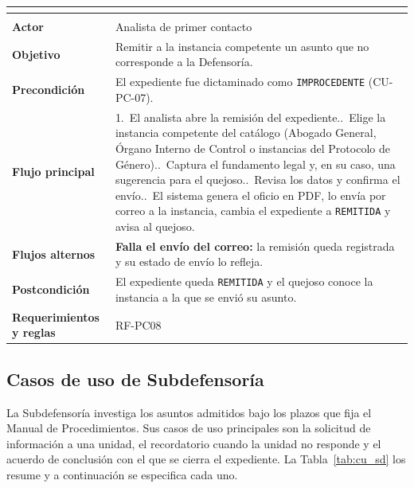 \begingroup
{}
\small
\renewcommand{\arraystretch}{1.25}
\setlength{\tabcolsep}{4pt}
\begin{longtable}{|L{3.2cm}|L{12.4cm}|}
	\hline
	 \\
	\hline
	\endfirsthead
	\hline
	 \\
	\hline
	\endhead
	\textbf{Actor} & Analista de primer contacto \\ \hline
	\textbf{Objetivo} & Remitir a la instancia competente un asunto que no corresponde a la Defensoría. \\ \hline
	\textbf{Precondición} & El expediente fue dictaminado como \texttt{IMPROCEDENTE} (CU-PC-07). \\ \hline
	\textbf{Flujo principal} & 1.~El analista abre la remisión del expediente..~Elige la instancia competente del catálogo (Abogado General, Órgano Interno de Control o instancias del Protocolo de Género)..~Captura el fundamento legal y, en su caso, una sugerencia para el quejoso..~Revisa los datos y confirma el envío..~El sistema genera el oficio en PDF, lo envía por correo a la instancia, cambia el expediente a \texttt{REMITIDA} y avisa al quejoso. \\ \hline
	\textbf{Flujos alternos} & \textbf{Falla el envío del correo:} la remisión queda registrada y su estado de envío lo refleja. \\ \hline
	\textbf{Postcondición} & El expediente queda \texttt{REMITIDA} y el quejoso conoce la instancia a la que se envió su asunto. \\ \hline
	\textbf{Requerimientos y reglas} & RF-PC08 \\ \hline
\end{longtable}
\endgroup

\subsection{Casos de uso de Subdefensoría}
La Subdefensoría investiga los asuntos admitidos bajo los plazos que fija el Manual de Procedimientos. Sus casos de uso principales son la solicitud de información a una unidad, el recordatorio cuando la unidad no responde y el acuerdo de conclusión con el que se cierra el expediente. La Tabla~\ref{tab:cu_sd} los resume y a continuación se especifica cada uno.

